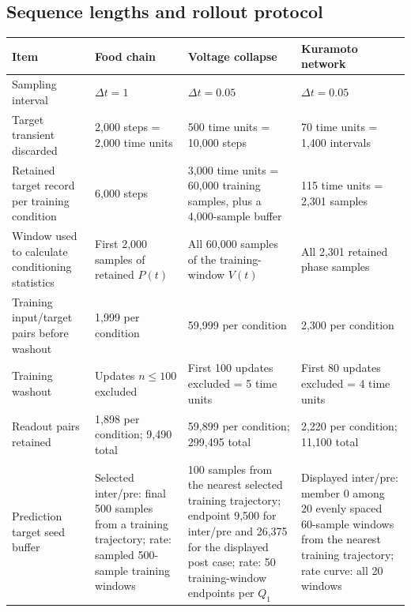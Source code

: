 \documentclass[10pt,a4paper]{article}
\begin{document}
\begin{landscape}
\section{Sequence lengths and rollout protocol}

\centering
{}
\label{tab:sequence}
\small
\begin{tabularx}{\linewidth}{L{38mm} Y Y Y}
\toprule
Item & Food chain & Voltage collapse & Kuramoto network \\
\midrule
Sampling interval
& $\Delta t=1$
& $\Delta t=0.05$
& $\Delta t=0.05$ \\

Target transient discarded
& 2,000 steps = 2,000 time units
& 500 time units = 10,000 steps
& 70 time units = 1,400 intervals \\

Retained target record per training condition
& 6,000 steps
& 3,000 time units = 60,000 training samples, plus a 4,000-sample buffer
& 115 time units = 2,301 samples \\

Window used to calculate conditioning statistics
& First 2,000 samples of retained $P(t)$
& All 60,000 samples of the training-window $V(t)$
& All 2,301 retained phase samples \\

Training input/target pairs before washout
& 1,999 per condition
& 59,999 per condition
& 2,300 per condition \\

Training washout
& Updates $n\le100$ excluded
& First 100 updates excluded = 5 time units
& First 80 updates excluded = 4 time units \\

Readout pairs retained
& 1,898 per condition; 9,490 total
& 59,899 per condition; 299,495 total
& 2,220 per condition; 11,100 total \\

Prediction target seed buffer
& Selected inter/pre: final 500 samples from a training trajectory; rate: sampled 500-sample training windows
& 100 samples from the nearest selected training trajectory; endpoint 9,500 for inter/pre and 26,375 for the displayed post case; rate: 50 training-window endpoints per $Q_1$
& Displayed inter/pre: member 0 among 20 evenly spaced 60-sample windows from the nearest training trajectory; rate curve: all 20 windows \\


\end{tabularx}
\end{landscape}
\end{document}
